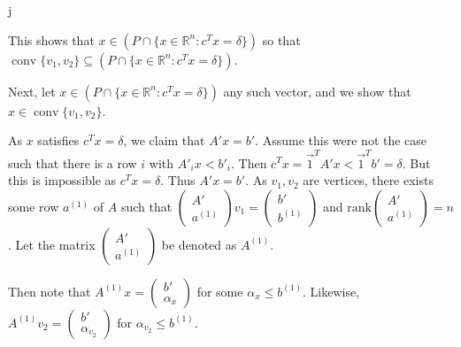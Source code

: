 j\documentclass[11pt]{article}
\DeclareMathOperator{\conv}{conv}
\newcommand{\setR}{\mathbb{R}}
\renewcommand{\leq}{\leqslant}
\newcommand{\rank}{\mathrm{rank}}
\begin{document}
\begin{enumerate}[1)]
\begin{solution}
This shows that $x \in (P \cap \{x \in \setR^n: c^Tx = \delta\})$ so that $ \conv\{v_1, v_2\} \subseteq (P \cap \{x \in \setR^n: c^Tx = \delta\})$. 


Next, let $x \in  (P \cap \{x \in \setR^n: c^Tx = \delta\})$ any such vector, and we show that $x \in  \conv\{v_1, v_2\}$. 

As $x$ satisfies $c^Tx = \delta$, we claim that $A'x = b'$. Assume this were not the case such that there is a row $i$ with $A'_i x < b'_i$. Then $c^Tx = \vec{1}^T A' x < \vec{1}^T b' = \delta$. But this is impossible as $c^Tx = \delta$. Thus $A'x = b'$. As $v_1, v_2$ are vertices, there exists some row $a^{(1)}$ of $A$ such that $\begin{pmatrix} A' \\ a^{(1)} \end{pmatrix} v_1 = \begin{pmatrix} b' \\ b^{(1)} \end{pmatrix}$ and $\rank \begin{pmatrix} A' \\ a^{(1)}\end{pmatrix} = n$. Let the matrix $\begin{pmatrix} A' \\ a^{(1)} \end{pmatrix}$ be denoted as $A^{(1)}$. 

Then note that $ A^{(1)} x =  \begin{pmatrix} b' \\ \alpha_x\end{pmatrix}$ for some $\alpha_x \leq b^{(1)}$. Likewise,  $ A^{(1)} v_2=  \begin{pmatrix} b' \\ \alpha_{v_2}\end{pmatrix}$ for $\alpha_{v_2} \leq b^{(1)}$. 


\end{solution}
\end{enumerate}
\end{document}
